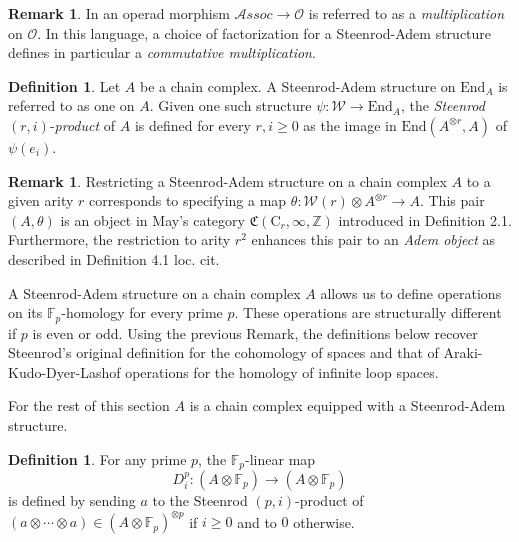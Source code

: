 \documentclass[A4]{amsart}
\theoremstyle{definition}
\newtheorem{definition}[theorem]{Definition}
\newtheorem{remark}[theorem]{Remark}
\newcommand{\Z}{\mathbb{Z}}
\newcommand{\End}{\mathrm{End}}
\begin{document}
\begin{remark} \label{rmk: Deligne conjecture}
	In \cite{GerstenhaberVoronov} an operad morphism $\mathcal{A}ssoc \to \mathcal O$ is referred to as a \textit{multiplication} on $\mathcal O$. In this language, a choice of factorization for a Steenrod-Adem structure defines in particular a \textit{commutative multiplication}.
\end{remark}

\begin{definition}
	Let $A$ be a chain complex. A Steenrod-Adem structure on $\mathrm{End}_A$ is referred to as one on $A$. Given one such structure $\psi \colon \mathcal W \to \End_A$, the \textit{Steenrod} $(r, i)$-\textit{product} of $A$ is defined for every $r, i \geq 0$ as the image in $ \mathrm{End}(A^{\otimes r}, A)$ of $\psi(e_i)$.
\end{definition}

\begin{remark}
	Restricting a Steenrod-Adem structure on a chain complex $A$ to a given arity $r$ corresponds to specifying a map $\theta \colon \mathcal W(r) \otimes A^{\otimes r} \to A$. This pair $(A, \theta)$ is an object in May's category $\mathfrak{C}(\mathrm C_r, \infty, \Z)$ introduced in \cite{may70generalapproach} Definition 2.1. Furthermore, the restriction to arity $r^2$ enhances this pair to an \textit{Adem object} as described in Definition 4.1 loc. cit.
\end{remark}

A Steenrod-Adem structure on a chain complex $A$ allows us to define operations on its $\mathbb{F}_p$-homology for every prime $p$. These operations are structurally different if $p$ is even or odd. Using the previous Remark, the definitions below recover Steenrod's original definition for the cohomology of spaces and that of Araki-Kudo-Dyer-Lashof operations for the homology of infinite loop spaces.

For the rest of this section $A$ is a chain complex equipped with a Steenrod-Adem structure.

\begin{definition}
	For any prime $p$, the $\mathbb{F}_p$-linear map
	\begin{equation*}
	D^p_i : (A \otimes \mathbb{F}_p) \to (A \otimes \mathbb{F}_p)
	\end{equation*}
	is defined by sending $a$ to the Steenrod \mbox{$(p, i)$-product} of $(a \otimes \cdots \otimes a) \in (A \otimes \mathbb{F}_p)^{\otimes p}$ if $i \geq 0$ and to $0$ otherwise.
\end{definition}
\end{document}
